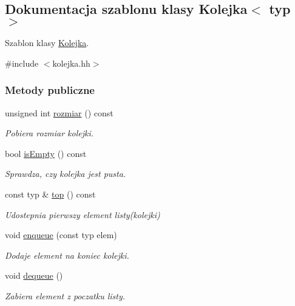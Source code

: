 \hypertarget{class_kolejka}{\subsection{Dokumentacja szablonu klasy Kolejka$<$ typ $>$}
\label{class_kolejka}
}


Szablon klasy \hyperlink{class_kolejka}{Kolejka}.  




{\ttfamily \#include $<$kolejka.\-hh$>$}

\subsubsection*{Metody publiczne}
\begin{DoxyCompactItemize}
\item 
unsigned int \hyperlink{class_kolejka_aaaacc0cfd468e5e07274570cb78b605c}{rozmiar} () const 
\begin{DoxyCompactList}\small\item\em Pobiera rozmiar kolejki. \end{DoxyCompactList}\item 
bool \hyperlink{class_kolejka_a8fdc8a751e07a6d977d24c865b62071c}{is\-Empty} () const 
\begin{DoxyCompactList}\small\item\em Sprawdza, czy kolejka jest pusta. \end{DoxyCompactList}\item 
const typ \& \hyperlink{class_kolejka_a50d4d2a8152185cf6ebd30ffab5782bc}{top} () const 
\begin{DoxyCompactList}\small\item\em Udostepnia pierwszy element listy(kolejki) \end{DoxyCompactList}\item 
void \hyperlink{class_kolejka_aaa965bb140ca766359e6109b2309c5e4}{enqueue} (const typ elem)
\begin{DoxyCompactList}\small\item\em Dodaje element na koniec kolejki. \end{DoxyCompactList}\item 
void \hyperlink{class_kolejka_ab588286ee0ad04a3e15d436c21f4e7d0}{dequeue} ()
\begin{DoxyCompactList}\small\item\em Zabiera element z poczatku listy. \end{DoxyCompactList}\end{DoxyCompactItemize}
